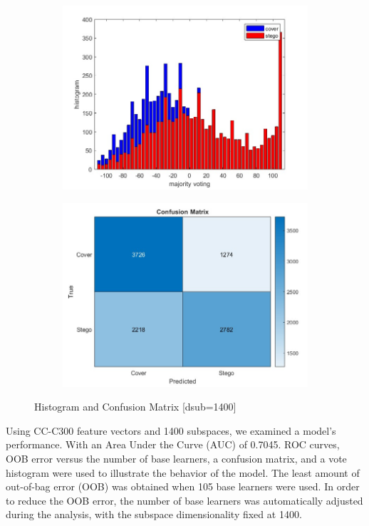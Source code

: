 \begin{figure}[H]
    \begin{subfigure}[b]{0.5\textwidth}
        \includegraphics[width=\textwidth]{img/1400/gray1400histo.jpg}
    \end{subfigure}
    \hfill
    \begin{subfigure}[b]{0.5\textwidth}
        \includegraphics[width=\textwidth]{img/1400/gray1400confuse.jpg}
    \end{subfigure}
    \caption{Histogram and Confusion Matrix [dsub=1400]}
\end{figure}
Using CC-C300 feature vectors and 1400 subspaces, we examined a model's performance. With an Area Under the Curve (AUC) of 0.7045. ROC curves, OOB error versus the number of base learners, a confusion matrix, and a vote histogram were used to illustrate the behavior of the model. The least amount of out-of-bag error (OOB) was obtained when 105 base learners were used. In order to reduce the OOB error, the number of base learners was automatically adjusted during the analysis, with the subspace dimensionality fixed at 1400.

